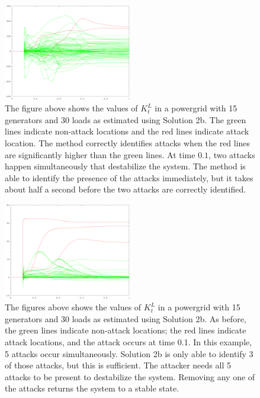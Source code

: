 \documentclass{article}
\begin{document}
\begin{figure}
\centering
\includegraphics[width=0.5\textwidth]{method2b/highP-6}
\caption{
    The figure above shows the values of $K_t^L$ in a powergrid with 15 generators and 30 loads as estimated using Solution 2b.
    The green lines indicate non-attack locations and the red lines indicate attack location.
    The method correctly identifies attacks when the red lines are significantly higher than the green lines.
    At time $0.1$, two attacks happen simultaneously that destabilize the system.
    The method is able to identify the presence of the attacks immediately,
    but it takes about half a second before the two attacks are correctly identified.
}
\end{figure}

\begin{figure}
\centering
\includegraphics[width=0.5\textwidth]{method2b/highP-6-5attack-zeros1}
\caption{
    The figures above shows the values of $K_t^L$ in a powergrid with 15 generators and 30 loads as estimated using Solution 2b.
    As before, the green lines indicate non-attack locations; the red lines indicate attack locations, and the attack occurs at time 0.1.
    In this example, 5 attacks occur simultaneously.
    Solution 2b is only able to identify 3 of those attacks,
    but this is sufficient.
    The attacker needs all 5 attacks to be present to destabilize the system.
    Removing any one of the attacks returns the system to a stable state.
}
\end{figure}
\end{document}
